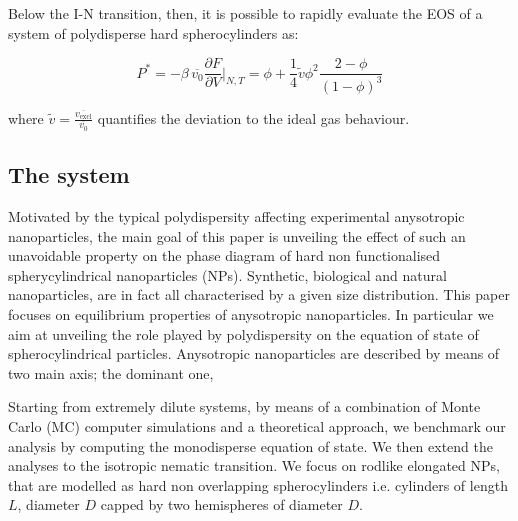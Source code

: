 \documentclass[journal=jacsat,manuscript=article]{achemso}
\begin{document}
Below the I-N transition, then, it is possible to rapidly evaluate the EOS of a system of polydisperse hard spherocylinders as:

\begin{equation}
	P^* =  - \beta \, \overline{v_0} \frac{\partial F}{\partial V} \Bigg \rvert _{N, T} = \phi + \frac{1}{4} \tilde{v} \phi^2 \frac{2 - \phi}{(1 - \phi)^3} \label{ParsonLee}
\end{equation}

where $\tilde{v} = \frac{\overline{v_\mathrm{excl}}}{\overline{v_0}}$ quantifies the deviation to the ideal gas behaviour.



\subsection{The system}
Motivated by the typical polydispersity affecting experimental anysotropic nanoparticles,  the main goal  of this paper is unveiling the effect of such an unavoidable property  on the phase diagram of hard non functionalised spherycylindrical nanoparticles (NPs). Synthetic,  biological  and natural nanoparticles, are in fact all characterised by a given size distribution. This paper focuses on equilibrium properties of anysotropic nanoparticles. In particular we aim at unveiling the role played by polydispersity on the equation of state of spherocylindrical particles. Anysotropic nanoparticles are described by means of two main axis; the dominant one, 

Starting from extremely dilute systems, by means of a combination of Monte Carlo (MC) computer simulations and a theoretical approach, we benchmark our analysis by computing the monodisperse equation of state. We then extend the analyses to the isotropic nematic transition. We focus on rodlike elongated NPs, that are modelled as hard non overlapping spherocylinders i.e. cylinders of length $L$, diameter $D$ capped by two hemispheres of diameter $D$. 
\end{document}
